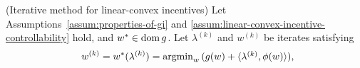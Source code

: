 \begin{theorem} (Iterative method for linear-convex incentives)
\label{thm:linear-convex-incentives-iterative-method}
Let Assumptions~\ref{assum:properties-of-gi} and \ref{assum:linear-convex-incentive-controllability} hold, and $w^* \in \operatorname{dom}{g}$.
Let $\lambda^{(k)}$ and $w^{(k)}$ be iterates satisfying
\begin{subequations}
\label{eq:linear-convex-incentives-iterative-method-const-step}
\begin{flalign}
    & w^{(k)} = w^*(\lambda^{(k)}) = \textstyle{\argmin}_w \, (g(w) + \langle \lambda^{(k)}, \phi(w)\rangle), \span\span \hspace{-5pt} \label{subeq:linear-convex-incentives-iterative-method-const-step-gradient} \\

\end{flalign}
\end{subequations}
\end{theorem}
